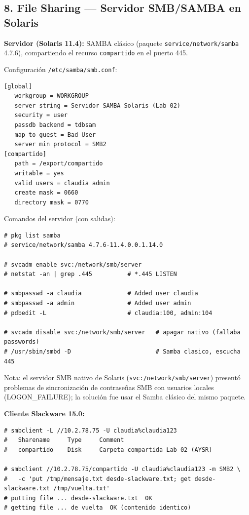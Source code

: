 \subsection{8. File Sharing --- Servidor SMB/SAMBA en Solaris}

\textbf{Servidor (Solaris 11.4):} SAMBA clásico (paquete \texttt{service/network/samba} 4.7.6), compartiendo el recurso \texttt{compartido} en el puerto 445.

Configuración \texttt{/etc/samba/smb.conf}:

\begin{lstlisting}
[global]
   workgroup = WORKGROUP
   server string = Servidor SAMBA Solaris (Lab 02)
   security = user
   passdb backend = tdbsam
   map to guest = Bad User
   server min protocol = SMB2
[compartido]
   path = /export/compartido
   writable = yes
   valid users = claudia admin
   create mask = 0660
   directory mask = 0770
\end{lstlisting}

Comandos del servidor (con salidas):

\begin{lstlisting}
# pkg list samba
# service/network/samba 4.7.6-11.4.0.0.1.14.0

# svcadm enable svc:/network/smb/server
# netstat -an | grep .445          # *.445 LISTEN

# smbpasswd -a claudia             # Added user claudia
# smbpasswd -a admin               # Added user admin
# pdbedit -L                       # claudia:100, admin:104

# svcadm disable svc:/network/smb/server   # apagar nativo (fallaba passwords)
# /usr/sbin/smbd -D                        # Samba clasico, escucha 445
\end{lstlisting}

Nota: el servidor SMB nativo de Solaris (\texttt{svc:/network/smb/server}) presentó problemas de sincronización de contraseñas SMB con usuarios locales (LOGON\_FAILURE); la solución fue usar el Samba clásico del mismo paquete.

\textbf{Cliente Slackware 15.0:}

\begin{lstlisting}
# smbclient -L //10.2.78.75 -U claudia%claudia123
#   Sharename     Type     Comment
#   compartido    Disk     Carpeta compartida Lab 02 (AYSR)

# smbclient //10.2.78.75/compartido -U claudia%claudia123 -m SMB2 \
#   -c 'put /tmp/mensaje.txt desde-slackware.txt; get desde-slackware.txt /tmp/vuelta.txt'
# putting file ... desde-slackware.txt  OK
# getting file ... de vuelta  OK (contenido identico)
\end{lstlisting}

